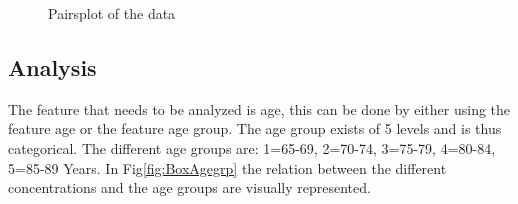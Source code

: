 \documentclass{article}
\begin{document}
      \begin{figure}
          \centering
          \caption{Pairsplot of the data}
          \label{fig:Pairs}
      \end{figure}

    \subsection{Analysis}
      The feature that needs to be analyzed is age, this can be done by either using the feature age or the feature age group.
      The age group exists of 5 levels and is thus categorical.
      The different age groups are: 1=65-69, 2=70-74, 3=75-79, 4=80-84, 5=85-89 Years.
      In Fig\ref{fig:BoxAgegrp} the relation between the different concentrations and the age groups are visually represented.
\end{document}
